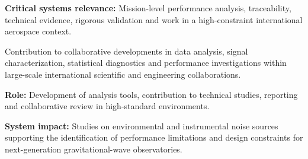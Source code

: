\documentclass[8pt,a4paper,ragged2e,withhyper]{altacv}
\begin{document}
\textbf{Critical systems relevance:} Mission-level performance analysis, traceability, technical evidence, rigorous validation and work in a high-constraint international aerospace context.

\divider


Contribution to collaborative developments in data analysis, signal characterization, statistical diagnostics and performance investigations within large-scale international scientific and engineering collaborations.

\textbf{Role:} Development of analysis tools, contribution to technical studies, reporting and collaborative review in high-standard environments.

\textbf{System impact:} Studies on environmental and instrumental noise sources supporting the identification of performance limitations and design constraints for next-generation gravitational-wave observatories.


\vspace{-.3cm}


{\small
{}
}

\divider\smallskip
\vspace{-.3cm}
\newline
{}

{\small
{}
}

\divider\smallskip
\vspace{-.3cm}
\end{document}
